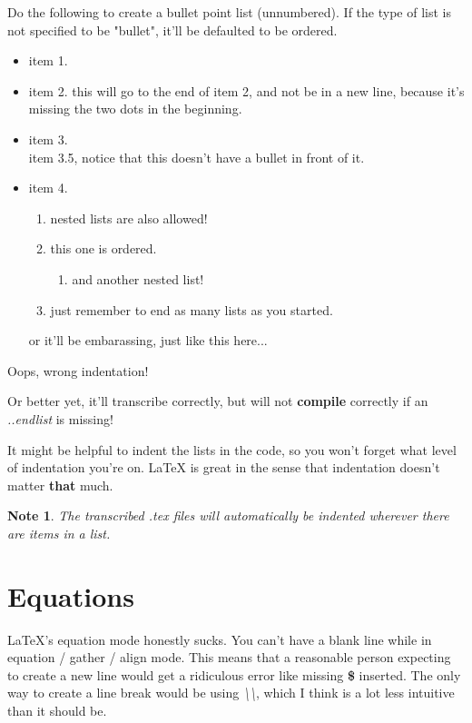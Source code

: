 \documentclass[12pt]{article}
\newtheorem{Note}[Lemma]{Note}
\begin{document}
Do the following to create a bullet point list (unnumbered).
If the type of list is not specified to be "bullet", it'll be defaulted to be
ordered.
\begin{itemize}
    \item item 1.
    \item item 2.
    this will go to the end of item 2, and not be in a new line, because it's missing the two dots in the beginning.
    \item item 3.
    \\ item 3.5, notice that this doesn't have a bullet in front of it.
    \item item 4.
    \begin{enumerate}
        \item nested lists are also allowed!
        \item this one is ordered.
        \begin{enumerate}
            \item and another nested list!
        \end{enumerate}
        \item just remember to end as many lists as you started.
    \end{enumerate}
    
    or it'll be embarassing, just like this here...
    
\end{itemize}

Oops, wrong indentation!

Or better yet, it'll transcribe correctly,
but will not \textbf{compile} correctly if an \emph{..endlist} is missing!

It might be helpful to indent the lists in the code, so you won't forget what level of indentation you're on. LaTeX is great in the sense that indentation doesn't matter \textbf{that} much.

\begin{Note}
The transcribed .tex files will automatically be indented wherever there are items in a list.
\end{Note}

\section{Equations}

LaTeX's equation mode honestly sucks. You can't have a blank line while in equation / gather / align mode. This means that a reasonable person expecting to create a new line would get a ridiculous error like missing \textbf{\$} inserted. The only way to create a line break would be using \emph{\textbackslash\textbackslash}, which I think is a lot less intuitive than it should be.
\end{document}
